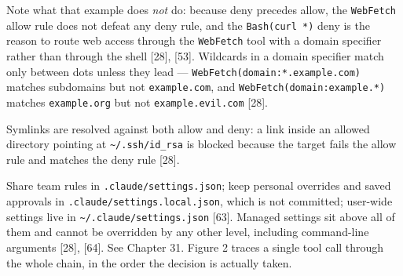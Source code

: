 \documentclass[11pt,a4paper,twoside,openany]{book}
\begin{document}
Note what that example does \emph{not} do: because deny precedes allow, the \texttt{Web\allowbreak{}Fetch} allow rule does not defeat any deny rule, and the \texttt{Bash(curl *\allowbreak{})} deny is the reason to route web access through the \texttt{Web\allowbreak{}Fetch} tool with a domain specifier rather than through the shell [28], [53]. Wildcards in a domain specifier match only between dots unless they lead — \texttt{Web\allowbreak{}Fetch(domai\allowbreak{}n:\allowbreak{}*.\allowbreak{}example.\allowbreak{}com)} matches subdomains but not \texttt{example.\allowbreak{}com}, and \texttt{Web\allowbreak{}Fetch(domai\allowbreak{}n:\allowbreak{}example.\allowbreak{}*)} matches \texttt{example.\allowbreak{}org} but not \texttt{example.\allowbreak{}evil.\allowbreak{}com} [28].


Symlinks are resolved against both allow and deny: a link inside an allowed directory pointing at \texttt{\textasciitilde{}/\allowbreak{}.\allowbreak{}ssh/\allowbreak{}id\_\allowbreak{}rsa} is blocked because the target fails the allow rule and matches the deny rule [28].


Share team rules in \texttt{.\allowbreak{}claude/\allowbreak{}settings.\allowbreak{}json}; keep personal overrides and saved approvals in \texttt{.\allowbreak{}claude/\allowbreak{}settings.\allowbreak{}local.\allowbreak{}json}, which is not committed; user-wide settings live in \texttt{\textasciitilde{}/\allowbreak{}.\allowbreak{}claude/\allowbreak{}settings.\allowbreak{}json} [63]. Managed settings sit above all of them and cannot be overridden by any other level, including command-line arguments [28], [64]. See Chapter 31. Figure 2 traces a single tool call through the whole chain, in the order the decision is actually taken.
\end{document}
